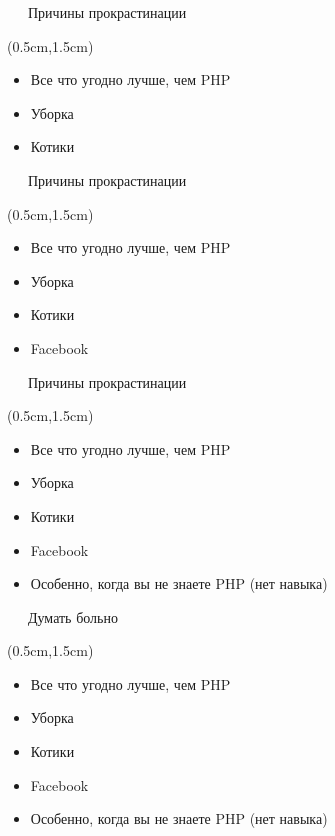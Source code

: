 \documentclass[xetex,18pt,aspectratio=43]{beamer}
\begin{document}
\begin{Large}
\begin{frame}{\ \ \ Причины прокрастинации}
\begin{textblock*}{\framewidth-0.8cm}(0.5cm,1.5cm)
\begin{itemize}
  \item Все что угодно лучше, чем PHP
  \item Уборка
  \item Котики
\end{itemize}
\end{textblock*}
\end{frame}

\begin{frame}{\ \ \ Причины прокрастинации}
\begin{textblock*}{\framewidth-0.8cm}(0.5cm,1.5cm)
\begin{itemize}
  \item Все что угодно лучше, чем PHP
  \item Уборка
  \item Котики
  \item Facebook
\end{itemize}
\end{textblock*}
\end{frame}

\begin{frame}{\ \ \ Причины прокрастинации}
\begin{textblock*}{\framewidth-0.8cm}(0.5cm,1.5cm)
\begin{itemize}
  \item Все что угодно лучше, чем PHP
  \item Уборка
  \item Котики
  \item Facebook
  \item Особенно, когда вы не знаете PHP (нет навыка)
\end{itemize}
\end{textblock*}
\end{frame}

\begin{frame}{\ \ \ Думать больно}
\begin{textblock*}{\framewidth-0.8cm}(0.5cm,1.5cm)
\begin{itemize}
  \item Все что угодно лучше, чем PHP
  \item Уборка
  \item Котики
  \item Facebook
  \item Особенно, когда вы не знаете PHP (нет навыка)
\end{itemize}
\end{textblock*}
\end{frame}


\end{Large}
\end{document}
